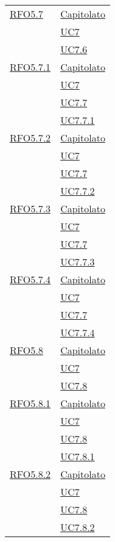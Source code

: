 \begin{longtable}{|>{\centering}m{5cm}|m{5cm}<{\centering}|}
\hyperlink{RFO5.7}{RFO5.7} & \hyperlink{Capitolato}{Capitolato}\\
& \hyperref[UC7]{UC7}\\
& \hyperref[UC7.6]{UC7.6}\\ \hline

\hyperlink{RFO5.7.1}{RFO5.7.1} & \hyperlink{Capitolato}{Capitolato}\\
& \hyperref[UC7]{UC7}\\
& \hyperref[UC7.7]{UC7.7}\\
& \hyperref[UC7.7.1]{UC7.7.1}\\ \hline

\hyperlink{RFO5.7.2}{RFO5.7.2} & \hyperlink{Capitolato}{Capitolato}\\
& \hyperref[UC7]{UC7}\\
& \hyperref[UC7.7]{UC7.7}\\
& \hyperref[UC7.7.2]{UC7.7.2}\\ \hline

\hyperlink{RFO5.7.3}{RFO5.7.3} & \hyperlink{Capitolato}{Capitolato}\\
& \hyperref[UC7]{UC7}\\
& \hyperref[UC7.7]{UC7.7}\\
& \hyperref[UC7.7.3]{UC7.7.3}\\ \hline

\hyperlink{RFO5.7.4}{RFO5.7.4} & \hyperlink{Capitolato}{Capitolato}\\
& \hyperref[UC7]{UC7}\\
& \hyperref[UC7.7]{UC7.7}\\
& \hyperref[UC7.7.4]{UC7.7.4}\\ \hline

\hyperlink{RFO5.8}{RFO5.8} & \hyperlink{Capitolato}{Capitolato}\\
& \hyperref[UC7]{UC7}\\
& \hyperref[UC7.8]{UC7.8}\\
 \hline
 
 \hyperlink{RFO5.8.1}{RFO5.8.1} & \hyperlink{Capitolato}{Capitolato}\\
 & \hyperref[UC7]{UC7}\\
 & \hyperref[UC7.8]{UC7.8}\\
  & \hyperref[UC7.8.1]{UC7.8.1}\\
 \hline
 
 \hyperlink{RFO5.8.2}{RFO5.8.2} & \hyperlink{Capitolato}{Capitolato}\\
 & \hyperref[UC7]{UC7}\\
 & \hyperref[UC7.8]{UC7.8}\\
  & \hyperref[UC7.8.2]{UC7.8.2}\\
 \hline
 

\end{longtable}
